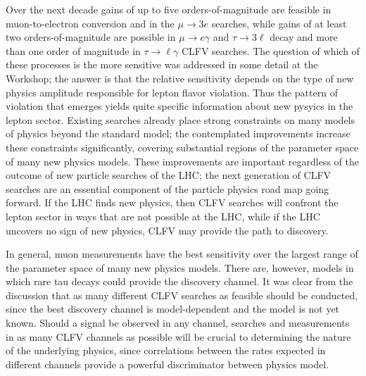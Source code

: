 \documentclass{tcibook}
\begin{document}
Over the next decade
gains of up to five orders-of-magnitude are feasible in
muon-to-electron conversion and in the $\mu \to 3 e$
searches, while gains of at least two orders-of-magnitude
are possible in $\mu \to e\gamma$ and $\tau \to 3\ell$ decay and more than one order of magnitude in $\tau \to \ell\gamma$ CLFV
searches.  The question of which of these processes is the more sensitive was addressed in some detail at the Workshop; the answer is that the relative sensitivity depends on the type of new physics amplitude responsible for lepton flavor violation. Thus the pattern of violation that emerges yields quite specific information about new pysyics in the lepton sector. Existing searches already place strong constraints on
many models of physics beyond the standard model; the contemplated improvements increase these constraints significantly, covering substantial regions of the parameter space of many new physics models.
These improvements are important regardless of the outcome of new particle searches of the
LHC; the next generation of CLFV searches are an essential
component of the particle physics road map going forward.  If the LHC finds new
physics, then CLFV searches will confront the lepton sector in ways
that are not possible at the LHC, while if the LHC uncovers no sign of
new physics, CLFV may provide the path to discovery.

In general, muon measurements have the best
sensitivity over the largest range of the parameter space of many new
physics models. There are, however, models
in which  rare tau decays could provide the discovery
channel. It was clear from the discussion that as many different
CLFV searches as feasible should be conducted, since the best discovery
channel is model-dependent and the model is not yet known.  Should a
signal be observed in any channel, searches and measurements in as
many CLFV channels as possible will be crucial to determining the nature
of the underlying physics, since correlations between the rates
expected in different channels provide a powerful discriminator between
physics model.
\end{document}
